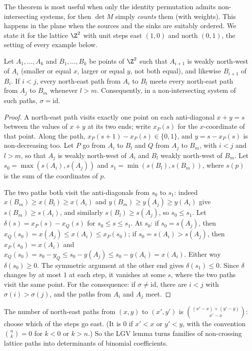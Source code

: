 The theorem is most useful when only the identity permutation admits non-intersecting systems, for then $\det M$ simply
\emph{counts} them (with weights). This happens in the plane when the sources and the sinks are suitably ordered. We
state it for the lattice $\Z^2$ with unit steps east $(1,0)$ and north $(0,1)$, the setting of every example below.

\begin{lemma}\label{linear:lem:planar}
Let $A_1,\dots,A_k$ and $B_1,\dots,B_k$ be points of $\Z^2$ such that $A_{i+1}$ is weakly north-west of $A_i$ (smaller or
equal $x$, larger or equal $y$, not both equal), and likewise $B_{i+1}$ of $B_i$. If $i<j$, every north-east path from
$A_i$ to $B_l$ meets every north-east path from $A_j$ to $B_m$ whenever $l>m$. Consequently, in a non-intersecting system
of such paths, $\sigma=\mathrm{id}$.
\end{lemma}
\begin{proof}
A north-east path visits exactly one point on each anti-diagonal $x+y=s$ between the values of $x+y$ at its two ends;
write $x_P(s)$ for the $x$-coordinate of that point. Along the path, $x_P(s+1)-x_P(s)\in\{0,1\}$, and $y=s-x_P(s)$ is
non-decreasing too. Let $P$ go from $A_i$ to $B_l$ and $Q$ from $A_j$ to $B_m$, with $i<j$ and $l>m$, so that $A_j$ is weakly
north-west of $A_i$ and $B_l$ weakly north-west of $B_m$. Let $s_0=\max(s(A_i),s(A_j))$ and $s_1=\min(s(B_l),s(B_m))$, where
$s(p)$ is the sum of the coordinates of $p$.

The two paths both visit the anti-diagonals from $s_0$ to $s_1$: indeed $x(B_m)\ge x(B_l)\ge x(A_i)$ and $y(B_m)\ge y(A_j)\ge
y(A_i)$ give $s(B_m)\ge s(A_i)$, and similarly $s(B_l)\ge s(A_j)$, so $s_0\le s_1$. Let $\delta(s)=x_P(s)-x_Q(s)$ for
$s_0\le s\le s_1$. At $s_0$: if $s_0=s(A_j)$, then $x_Q(s_0)=x(A_j)\le x(A_i)\le x_P(s_0)$; if $s_0=s(A_i)>s(A_j)$, then
$x_P(s_0)=x(A_i)$ and $x_Q(s_0)=s_0-y_Q\le s_0-y(A_j)\le s_0-y(A_i)=x(A_i)$. Either way $\delta(s_0)\ge0$. The symmetric argument at
the other end gives $\delta(s_1)\le0$. Since $\delta$ changes by at most $1$ at each step, it vanishes at some $s$, where
the two paths visit the same point. For the consequence: if $\sigma\ne\mathrm{id}$, there are $i<j$ with $\sigma(i)>\sigma(j)$, and
the paths from $A_i$ and $A_j$ meet.
\end{proof}

The number of north-east paths from $(x,y)$ to $(x',y')$ is $\binom{(x'-x)+(y'-y)}{x'-x}$: choose which of the steps go
east. (It is $0$ if $x'<x$ or $y'<y$, with the convention $\binom nk=0$ for $k<0$ or $k>n$.) So the LGV lemma turns
families of non-crossing lattice paths into determinants of binomial coefficients.


